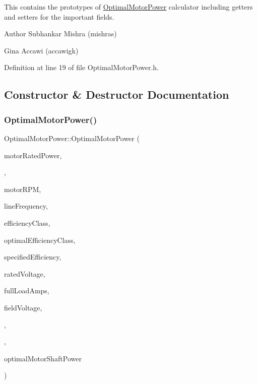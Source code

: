 This contains the prototypes of \hyperlink{class_optimal_motor_power}{Optimal\+Motor\+Power} calculator including getters and setters for the important fields.

\begin{DoxyAuthor}{Author}
Subhankar Mishra (mishras) 

Gina Accawi (accawigk) 
\end{DoxyAuthor}


Definition at line 19 of file Optimal\+Motor\+Power.\+h.



\subsection{Constructor \& Destructor Documentation}
\mbox{\label{class_optimal_motor_power_a655953d8e84d386a6e5ea4044098dcc0}} 
\subsubsection{\texorpdfstring{Optimal\+Motor\+Power()}{OptimalMotorPower()}\hspace{0.1cm}{\footnotesize\ttfamily [1/3]}}
{\footnotesize\ttfamily Optimal\+Motor\+Power\+::\+Optimal\+Motor\+Power (\begin{DoxyParamCaption}\item[{double}]{motor\+Rated\+Power,  }\item[{double}]{,  }\item[{int}]{motor\+R\+PM,  }\item[{\hyperlink{class_motor_acee1bdf1b684ad36cb80dc2829d9fcee}{Motor\+::\+Line\+Frequency}}]{line\+Frequency,  }\item[{\hyperlink{class_motor_afa022971ae062406a9f588c601673d4e}{Motor\+::\+Efficiency\+Class}}]{efficiency\+Class,  }\item[{\hyperlink{class_motor_afa022971ae062406a9f588c601673d4e}{Motor\+::\+Efficiency\+Class}}]{optimal\+Efficiency\+Class,  }\item[{double}]{specified\+Efficiency,  }\item[{double}]{rated\+Voltage,  }\item[{double}]{full\+Load\+Amps,  }\item[{double}]{field\+Voltage,  }\item[{\hyperlink{class_field_data_a424e89914ba5684c01bb269dbe3312fd}{Field\+Data\+::\+Load\+Estimation\+Method}}]{,  }\item[{double}]{,  }\item[{double}]{optimal\+Motor\+Shaft\+Power }\end{DoxyParamCaption})\hspace{0.3cm}{\ttfamily [inline]}}


